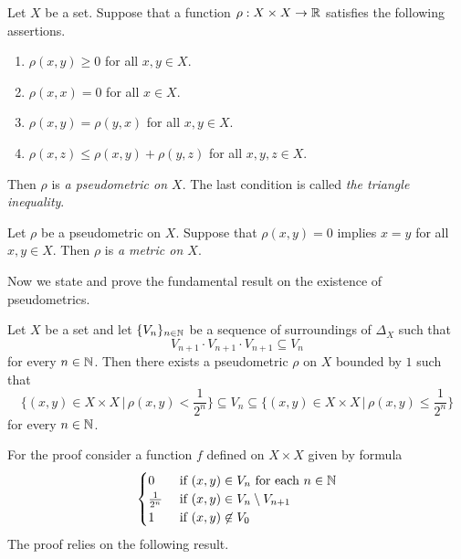 \begin{definition}
Let $X$ be a set. Suppose that a function $\rho:X\times X\rightarrow {\mathbb R}$ satisfies the following assertions.
\begin{enumerate}[label=\textbf{(\arabic*)}, leftmargin=*]
\item $\rho(x,y) \geq 0$ for all $x,y\in X$.
\item $\rho(x,x) = 0$ for all $x\in X$.
\item $\rho(x,y) = \rho(y,x)$ for all $x,y\in X$.
\item $\rho(x,z)\leq \rho(x,y) + \rho(y,z)$ for all $x,y,z\in X$.
\end{enumerate}
Then $\rho$ is \textit{a pseudometric on $X$}. The last condition is called \textit{the triangle inequality}.
\end{definition}

\begin{definition}
Let $\rho$ be a pseudometric on $X$. Suppose that $\rho(x,y) = 0$ implies $x = y$ for all $x,y\in X$. Then $\rho$ is \textit{a metric on $X$}.
\end{definition}
\noindent
Now we state and prove the fundamental result on the existence of pseudometrics.

\begin{theorem}\label{theorem:Weils_theorem_on_pseudometrics}
Let $X$ be a set and let $\{V_n\}_{n\in {\mathbb N}}$ be a sequence of surroundings of $\Delta_X$ such that
$$V_{n+1}\cdot V_{n+1}\cdot V_{n+1} \subseteq V_n$$
for every $n\in {\mathbb N}$. Then there exists a pseudometric $\rho$ on $X$ bounded by $1$ such that
$$\bigg\{(x,y)\in X\times X\,\bigg|\,\rho(x,y)<\frac{1}{2^n}\bigg\} \subseteq V_n \subseteq \bigg\{(x,y)\in X\times X\,\bigg|\,\rho(x,y) \leq \frac{1}{2^n}\bigg\}$$
for every $n\in {\mathbb N}$.
\end{theorem}
\noindent
For the proof consider a function $f$ defined on $X\times X$ given by formula 
$$\begin{cases}
0 & \mbox{ if }(x,y)\in V_n\mbox{ for each }n\in {\mathbb N}\\
\frac{1}{2^n} & \mbox{ if }(x,y)\in V_n\setminus V_{n+1}\\
1 & \mbox{ if }(x,y)\not \in V_0
\end{cases}$$
The proof relies on the following result. 

